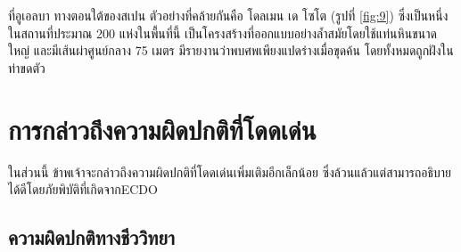 \documentclass[10pt,twocolumn,letterpaper]{article}
\begin{document}
ที่อูเอลบา ทางตอนใต้ของสเปน ตัวอย่างที่คล้ายกันคือ โดลเมน เด โซโต (รูปที่ \ref{fig:9}) ซึ่งเป็นหนึ่งในสถานที่ประมาณ 200 แห่งในพื้นที่นี้ \cite{72,32} เป็นโครงสร้างที่ออกแบบอย่างล้ำสมัยโดยใช้แท่นหินขนาดใหญ่ และมีเส้นผ่าศูนย์กลาง 75 เมตร มีรายงานว่าพบศพเพียงแปดร่างเมื่อขุดค้น โดยทั้งหมดถูกฝังในท่าขดตัว                                         

\section{การกล่าวถึงความผิดปกติที่โดดเด่น}

ในส่วนนี้ ข้าพเจ้าจะกล่าวถึงความผิดปกติที่โดดเด่นเพิ่มเติมอีกเล็กน้อย ซึ่งล้วนแล้วแต่สามารถอธิบายได้ดีโดยภัยพิบัติที่เกิดจากECDO

\subsection{ความผิดปกติทางชีววิทยา}
\end{document}
